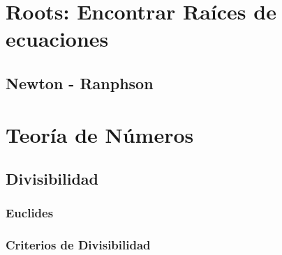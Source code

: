 \documentclass[12pt, fleqn]{report}                             %
\theoremstyle{break}                                            %
\begin{document}
    \chapter{Roots: Encontrar Raíces de ecuaciones}

        \section{Newton - Ranphson}


    
    \clearpage
    \chapter{Teoría de Números}

        \section{Divisibilidad}

            \subsection{Euclides}

            \subsection{Criterios de Divisibilidad}

\end{document}
